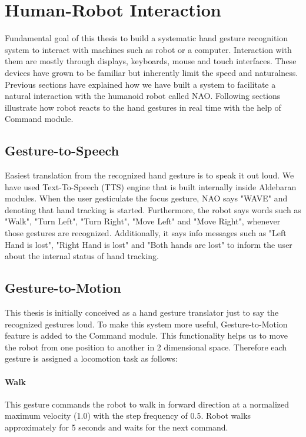 \section{Human-Robot Interaction} Fundamental goal of this thesis to build a systematic hand gesture recognition system to interact with machines such as robot or a computer. Interaction with them are mostly through displays, keyboards, mouse and touch interfaces. These devices have grown to be familiar but inherently limit the speed and naturalness. Previous sections have explained how we have built a system to facilitate a natural interaction with the humanoid robot called NAO. Following sections illustrate how robot reacts to the hand gestures in real time with the help of Command module.

\subsection{Gesture-to-Speech} Easiest translation from the recognized hand gesture is to speak it out loud. We have used Text-To-Speech (TTS) engine that is built internally inside Aldebaran modules. When the user gesticulate the focus gesture, NAO says "WAVE" and denoting that hand tracking is started. Furthermore, the robot says words such as "Walk", "Turn Left", "Turn Right", "Move Left" and "Move Right", whenever those gestures are recognized. Additionally, it says info messages such as "Left Hand is lost", "Right Hand is lost" and "Both hands are lost" to inform the user about the internal status of hand tracking.

\subsection{Gesture-to-Motion} This thesis is initially conceived as a hand gesture translator just to say the recognized gestures loud. To make this system more useful, Gesture-to-Motion feature is added to the Command module. This functionality helps us to move the robot from one position to another in 2 dimensional space. Therefore each gesture is assigned a locomotion task as follows:

\paragraph*{Walk} This gesture commands the robot to walk in forward direction at a normalized maximum velocity (1.0) with the step frequency of 0.5. Robot walks approximately for 5 seconds and waits for the next command.

